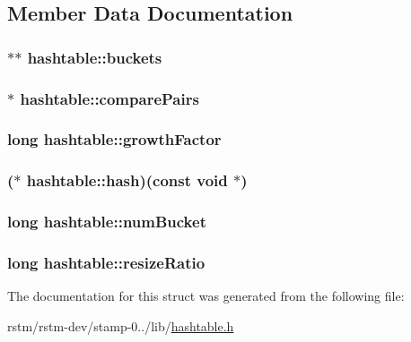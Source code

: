 \subsection{Member Data Documentation}
\hypertarget{structhashtable_a1adbcc414b295815bfa5c9d0785ceded}{
\subsubsection[{buckets}]{$\ast$$\ast$ hashtable\-::buckets}}\label{structhashtable_a1adbcc414b295815bfa5c9d0785ceded}
\hypertarget{structhashtable_aab34ba0f89c3fb5600150496be66743e}{
\subsubsection[{compare\-Pairs}]{$\ast$ hashtable\-::compare\-Pairs}}\label{structhashtable_aab34ba0f89c3fb5600150496be66743e}
\hypertarget{structhashtable_ae2c4a39d662cc18a7763ebcf3f0e2495}{
\subsubsection[{growth\-Factor}]{\setlength{\rightskip}{0pt plus 5cm}long hashtable\-::growth\-Factor}}\label{structhashtable_ae2c4a39d662cc18a7763ebcf3f0e2495}
\hypertarget{structhashtable_a5d157f331daf555aeedd9e9b3b7e1bd1}{
\subsubsection[{hash}]{($\ast$ hashtable\-::hash)(const void $\ast$)}}\label{structhashtable_a5d157f331daf555aeedd9e9b3b7e1bd1}
\hypertarget{structhashtable_acaec0de05e91bb1e9d4f8350f6e0564c}{
\subsubsection[{num\-Bucket}]{\setlength{\rightskip}{0pt plus 5cm}long hashtable\-::num\-Bucket}}\label{structhashtable_acaec0de05e91bb1e9d4f8350f6e0564c}
\hypertarget{structhashtable_a5641b7e26e1b1fdf4a1a34c82ce87916}{
\subsubsection[{resize\-Ratio}]{\setlength{\rightskip}{0pt plus 5cm}long hashtable\-::resize\-Ratio}}\label{structhashtable_a5641b7e26e1b1fdf4a1a34c82ce87916}


The documentation for this struct was generated from the following file\-:\begin{DoxyCompactItemize}
\item 
rstm/rstm-\/dev/stamp-\/0../lib/\hyperlink{hashtable_8h}{hashtable.\-h}\end{DoxyCompactItemize}
